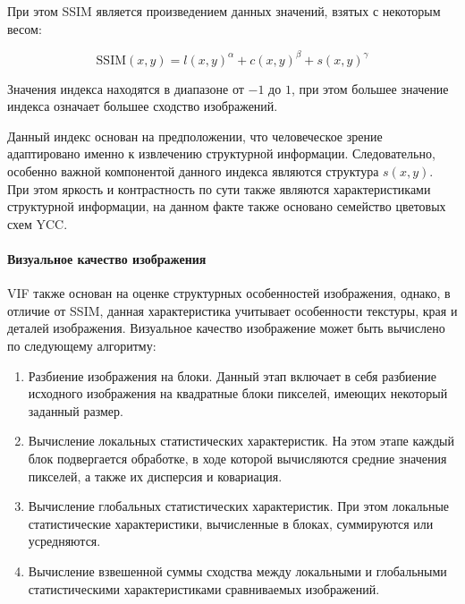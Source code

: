 При этом SSIM является произведением данных значений, взятых с некоторым весом:

\begin{equation} \label{eq:ssim_per_component}
    \text{SSIM}\left(x, y\right) = l\left(x, y\right)^{\alpha} +
        c\left(x, y\right)^{\beta} +
        s\left(x, y\right)^{\gamma}
\end{equation}

Значения индекса находятся в диапазоне от $-1$ до $1$, при этом большее значение
индекса означает большее сходство изображений.

Данный индекс основан на предположении, что человеческое зрение адаптировано
именно к извлечению структурной информации\cite{SSIMArticle}. Следовательно,
особенно важной компонентой данного индекса являются структура $s\left(x,
y\right)$. При этом яркость и контрастность по сути также являются
характеристиками структурной информации, на данном факте также основано
семейство цветовых схем YCC.

\paragraph{Визуальное качество изображения}

VIF также основан на оценке структурных особенностей изображения, однако, в
отличие от SSIM, данная характеристика учитывает особенности текстуры, края и
деталей изображения\cite{VIF}. Визуальное качество изображение может быть
вычислено по следующему алгоритму:

\begin{enumerate}
    \item Разбиение изображения на блоки. Данный этап включает в себя разбиение
    исходного изображения на квадратные блоки пикселей, имеющих некоторый
    заданный размер.
    \item Вычисление локальных статистических характеристик. На этом этапе
    каждый блок подвергается обработке, в ходе которой вычисляются средние
    значения пикселей, а также их дисперсия и ковариация.
    \item Вычисление глобальных статистических характеристик. При этом локальные
    статистические характеристики, вычисленные в блоках, суммируются или
    усредняются.
    \item Вычисление взвешенной суммы сходства между локальными и глобальными
    статистическими характеристиками сравниваемых изображений.
\end{enumerate}

